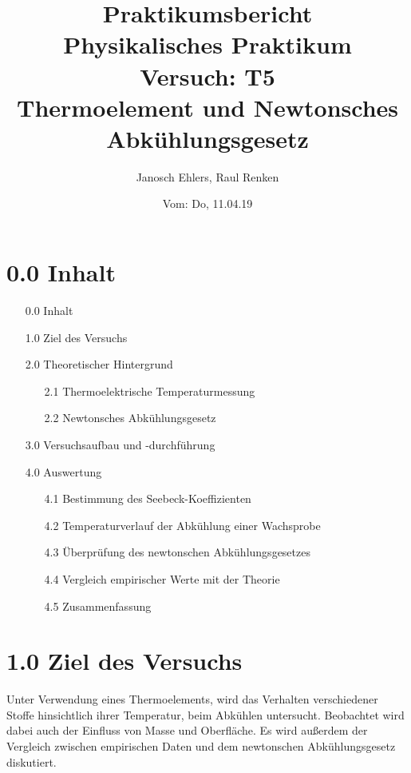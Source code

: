 \documentclass[a4paper]{article}
\begin{document}

\title{Praktikumsbericht \\ Physikalisches Praktikum \\ Versuch: T5 \\ Thermoelement und Newtonsches Abkühlungsgesetz}
\author{Janosch Ehlers, Raul Renken}
\date{Vom: Do, 11.04.19 }
\maketitle
\newpage

\section*{0.0 Inhalt}
\begin{itemize}
\item[0.0] Inhalt
\item[1.0] Ziel des Versuchs
\item[2.0] Theoretischer Hintergrund
\begin{itemize}
\item[2.1] 		Thermoelektrische Temperaturmessung
\item[2.2] 		Newtonsches Abkühlungsgesetz
\end{itemize}
\item[3.0] Versuchsaufbau und -durchführung
\item[4.0] Auswertung
\begin{itemize}
\item[4.1] 		Bestimmung des Seebeck-Koeffizienten
\item[4.2] 		Temperaturverlauf der Abkühlung einer Wachsprobe
\item[4.3] 		Überprüfung des newtonschen Abkühlungsgesetzes
\item[4.4] 		Vergleich empirischer Werte mit der Theorie
\item[4.5] 		Zusammenfassung
\end{itemize}
\end{itemize}

\section*{1.0 Ziel des Versuchs}

Unter Verwendung eines Thermoelements, wird das Verhalten verschiedener Stoffe hinsichtlich ihrer Temperatur, beim Abkühlen untersucht. Beobachtet wird dabei auch der Einfluss von Masse und Oberfläche. Es wird außerdem der Vergleich zwischen empirischen Daten und dem newtonschen Abkühlungsgesetz diskutiert.\\
\end{document}
